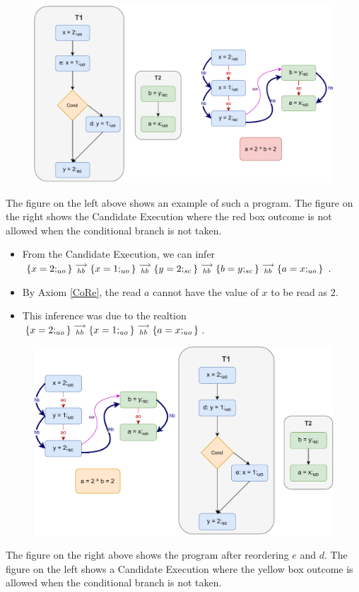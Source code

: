         \begin{figure}[H]
            \centering 
            \includegraphics[scale=0.7]{5.InstructionReordering/5.ValidReorderingProgram/CounterExamples2a(Conditionals).pdf}
            \caption{}
        \end{figure}
        The figure on the left above shows an example of such a program.  
        The figure on the right shows the Candidate Execution where the red box outcome is not allowed when the conditional branch is not taken.
        \begin{itemize}
            \item From the Candidate Execution, we can infer $\{x=2;_{uo}\}\stackrel{\longrightarrow}{_{hb}}\{x=1;_{uo}\}\stackrel{\longrightarrow}{_{hb}}\{y=2;_{sc}\}\stackrel{\longrightarrow}{_{hb}}\{b=y;_{sc}\}\stackrel{\longrightarrow}{_{hb}}\{a=x;_{uo}\}$.
            \item By Axiom \ref{CoRe}, the read $a$ cannot have the value of $x$ to be read as $2$.  
            \item This inference was due to the realtion $\{x=2;_{uo}\}\stackrel{\longrightarrow}{_{hb}}\{x=1;_{uo}\}\stackrel{\longrightarrow}{_{hb}}\{a=x;_{uo}\}$.
        \end{itemize}

        \begin{figure}[H]
            \centering 
            \includegraphics[scale=0.7]{5.InstructionReordering/5.ValidReorderingProgram/CounterExamples2b(Conditionals).pdf}
            \caption{}
        \end{figure}
        The figure on the right above shows the program after reordering $e$ and $d$.  
        The figure on the left shows a Candidate Execution where the yellow box outcome is allowed when the conditional branch is not taken\footnotemark.
        
